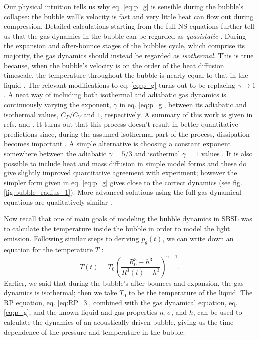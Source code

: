 \documentclass[prb,aps,nofootinbib,superscriptaddress,floatfix]{revtex4-2}
\begin{document}
Our physical intuition tells us why eq. \ref{eq:p_g} is sensible during the bubble's collapse: the bubble wall's velocity is fast and very little heat can flow out during compression. Detailed calculations starting from the full NS equations further tell us that the gas dynamics in the bubble can be regarded as \emph{quasistatic} \cite{brenner2002single}. During the expansion and after-bounce stages of the bubbles cycle, which comprise its majority, the gas dynamics should instead be regarded as \emph{isothermal}. This is true because, when the bubble's velocity is on the order of the heat diffusion timescale, the temperature throughout the bubble is nearly equal to that in the liquid \cite{prosperetti1999old,brenner2002single,yasui2018acoustic}. The relevant modifications to eq. \ref{eq:p_g} turns out to be replacing $\gamma\rightarrow 1$. A neat way of including both isothermal and adiabatic gas dynamics is continuously varying the exponent, $\gamma$ in eq. \ref{eq:p_g}, between its adiabatic and isothermal values, $C_P/C_V$ and $1$, respectively. A summary of this work is given in refs. \cite{brenner2002single} and \cite{prosperetti1999old}. It turns out that this process doesn't result in better quantitative predictions since, during the assumed isothermal part of the process, dissipation becomes important \cite{brenner2002single}. A simple alternative is choosing a constant exponent somewhere between the adiabatic $\gamma=5/3$ and isothermal $\gamma=1$ values \cite{hilgenfeldt1999simple}. It is also possible to include heat and mass diffusion in simple model forms and these do give slightly improved quantitative agreement with experiment; however the simpler form given in eq. \ref{eq:p_g} gives close to the correct dynamics (see fig. \ref{fig:bubble_radius_1}). More advanced solutions using the full gas dynamical equations are qualitatively similar \cite{brenner2002single,yasui2018acoustic}.

Now recall that one of main goals of modeling the bubble dynamics in SBSL was to calculate the temperature inside the bubble in order to model the light emission. Following similar steps to deriving $p_g(t)$, we can write down an equation for the temperature $T$ \cite{barber1997defining,brenner2002single}:
\begin{equation}
    T(t) = T_0 \left( \frac{R_0^3-h^3}{R^3(t)-h^3} \right)^ {\gamma-1}.
    \label{eq:T(t)}
\end{equation}
Earlier, we said that during the bubble's after-bounces and expansion, the gas dynamics is isothermal; then we take $T_0$ to be the temperature of the liquid. The RP equation, eq. \ref{eq:RP_3}, combined with the gas dynamical equation, eq. \ref{eq:p_g}, and the known liquid and gas properties $\eta$, $\sigma$, and $h$, can be used to calculate the dynamics of an acoustically driven bubble, giving us the time-dependence of the pressure and temperature in the bubble. 
\end{document}

